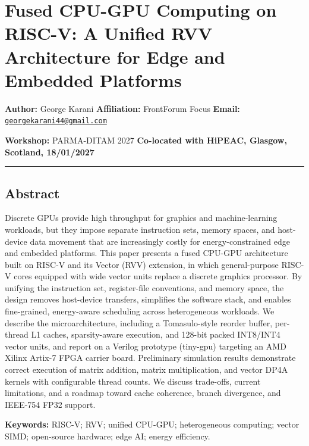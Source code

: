 \section{Fused CPU-GPU Computing on RISC-V: A Unified RVV Architecture
for Edge and Embedded
Platforms}\label{fused-cpu-gpu-computing-on-risc-v-a-unified-rvv-architecture-for-edge-and-embedded-platforms}

\textbf{Author:} George Karani \textbf{Affiliation:} FrontForum Focus
\textbf{Email:}
\href{mailto:georgekarani44@gmail.com}{\nolinkurl{georgekarani44@gmail.com}}

\textbf{Workshop:} PARMA-DITAM 2027 \textbf{Co-located with HiPEAC,
Glasgow, Scotland, 18/01/2027}

\begin{center}\rule{0.5\linewidth}{0.5pt}\end{center}

\subsection{Abstract}\label{abstract}

Discrete GPUs provide high throughput for graphics and machine-learning
workloads, but they impose separate instruction sets, memory spaces, and
host-device data movement that are increasingly costly for
energy-constrained edge and embedded platforms. This paper presents a
fused CPU-GPU architecture built on RISC-V and its Vector (RVV)
extension, in which general-purpose RISC-V cores equipped with wide
vector units replace a discrete graphics processor. By unifying the
instruction set, register-file conventions, and memory space, the design
removes host-device transfers, simplifies the software stack, and
enables fine-grained, energy-aware scheduling across heterogeneous
workloads. We describe the microarchitecture, including a Tomasulo-style
reorder buffer, per-thread L1 caches, sparsity-aware execution, and
128-bit packed INT8/INT4 vector units, and report on a Verilog prototype
(tiny-gpu) targeting an AMD Xilinx Artix-7 FPGA carrier board.
Preliminary simulation results demonstrate correct execution of matrix
addition, matrix multiplication, and vector DP4A kernels with
configurable thread counts. We discuss trade-offs, current limitations,
and a roadmap toward cache coherence, branch divergence, and IEEE-754
FP32 support.

\textbf{Keywords:} RISC-V; RVV; unified CPU-GPU; heterogeneous
computing; vector SIMD; open-source hardware; edge AI; energy
efficiency.

